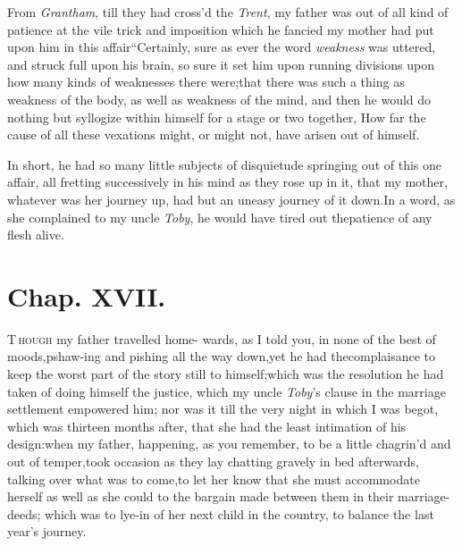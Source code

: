 \documentclass{article}
\begin{document}
\newpage
From \textit{Grantham}, till they had cross’d the
\textit{Trent}, my father was out of all kind of patience at the vile
trick and imposition which he fancied my mother had put upon him in
this affair\tsk  “Certainly,\break 
{} 
sure as ever the word \textit{weakness} was uttered, and
struck full upon his brain,\tsh\break
so sure it set him upon running divisions upon how
many kinds of weaknesses there were;\tsh  that there was\break 
such a thing as weakness of the body,\break
\tsh  as well as weakness of the mind,\tsk\break
and then he would do nothing but syl\-logize within himself for a stage or two\pb
together, How far the cause of all these\break
vexations might, or might not, have\break
arisen out of himself.

In short, he had so many little subjects of disquietude
springing out of this one affair, all fretting successively in his
mind as they rose up in it, that my mother, whatever was her
journey up, had but an uneasy journey of it down.\tsh\break  In a
word, as she complained to my uncle \textit{Toby}, he would have
tired out the\break patience of any flesh alive.

\section{Chap. XVII.}

\lettrine{T}{\,hough} my father travelled home-\break
wards, as I told you, in none of\break
the best of moods,\tsk  pshaw-ing and
pish\-ing all the way down,\tsk  yet he had the\pb complaisance to keep
the worst part of the story still to himself;\tsh  which was the
resolution he had taken of doing himself the justice, which my
uncle \textit{Toby}’s clause in the marriage settlement
empowered him; nor was it till the very night in which I was begot,
which was thirteen months after, that she had the least intimation
of his design:\tsh when my father, happening, as you remember, to be a
little chagrin’d and out of temper,\tsh  took
occasion as they lay chatting gravely in bed afterwards, talking
over what was to come,\tsh  to let her know that she must
accommodate herself as well as she could to the bargain made
between them in their marriage-deeds; which was to lye-in of her
next child in the country, to balance the last year’s
journey.
\end{document}
